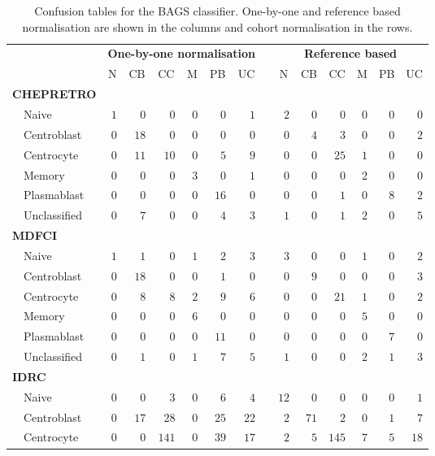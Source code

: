 \begin{table}[!tbp]
{\small
\caption{Confusion tables for the BAGS classifier. One-by-one and reference
based normalisation are shown in the columns and cohort normalisation in the
rows.\label{tab:BAGShemaclass}} 
\begin{center}
\begin{tabular}{lrrrrrrcrrrrrr}
\hline\hline
\multicolumn{1}{l}{\bfseries }&\multicolumn{6}{c}{\bfseries One-by-one normalisation}&\multicolumn{1}{c}{\bfseries }&\multicolumn{6}{c}{\bfseries Reference based}\tabularnewline
\cline{2-7} \cline{9-14}
\multicolumn{1}{l}{}&\multicolumn{1}{c}{N}&\multicolumn{1}{c}{CB}&\multicolumn{1}{c}{CC}&\multicolumn{1}{c}{M}&\multicolumn{1}{c}{PB}&\multicolumn{1}{c}{UC}&\multicolumn{1}{c}{}&\multicolumn{1}{c}{N}&\multicolumn{1}{c}{CB}&\multicolumn{1}{c}{CC}&\multicolumn{1}{c}{M}&\multicolumn{1}{c}{PB}&\multicolumn{1}{c}{UC}\tabularnewline
\hline
{\bfseries CHEPRETRO}&&&&&&&&&&&&&\tabularnewline
~~Naive&$1$&$ 0$&$  0$&$0$&$ 0$&$ 1$&&$ 2$&$ 0$&$  0$&$ 0$&$ 0$&$ 0$\tabularnewline
~~Centroblast&$0$&$18$&$  0$&$0$&$ 0$&$ 0$&&$ 0$&$ 4$&$  3$&$ 0$&$ 0$&$ 2$\tabularnewline
~~Centrocyte&$0$&$11$&$ 10$&$0$&$ 5$&$ 9$&&$ 0$&$ 0$&$ 25$&$ 1$&$ 0$&$ 0$\tabularnewline
~~Memory&$0$&$ 0$&$  0$&$3$&$ 0$&$ 1$&&$ 0$&$ 0$&$  0$&$ 2$&$ 0$&$ 0$\tabularnewline
~~Plasmablast&$0$&$ 0$&$  0$&$0$&$16$&$ 0$&&$ 0$&$ 0$&$  1$&$ 0$&$ 8$&$ 2$\tabularnewline
~~Unclassified&$0$&$ 7$&$  0$&$0$&$ 4$&$ 3$&&$ 1$&$ 0$&$  1$&$ 2$&$ 0$&$ 5$\tabularnewline
\hline
{\bfseries MDFCI}&&&&&&&&&&&&&\tabularnewline
~~Naive&$1$&$ 1$&$  0$&$1$&$ 2$&$ 3$&&$ 3$&$ 0$&$  0$&$ 1$&$ 0$&$ 2$\tabularnewline
~~Centroblast&$0$&$18$&$  0$&$0$&$ 1$&$ 0$&&$ 0$&$ 9$&$  0$&$ 0$&$ 0$&$ 3$\tabularnewline
~~Centrocyte&$0$&$ 8$&$  8$&$2$&$ 9$&$ 6$&&$ 0$&$ 0$&$ 21$&$ 1$&$ 0$&$ 2$\tabularnewline
~~Memory&$0$&$ 0$&$  0$&$6$&$ 0$&$ 0$&&$ 0$&$ 0$&$  0$&$ 5$&$ 0$&$ 0$\tabularnewline
~~Plasmablast&$0$&$ 0$&$  0$&$0$&$11$&$ 0$&&$ 0$&$ 0$&$  0$&$ 0$&$ 7$&$ 0$\tabularnewline
~~Unclassified&$0$&$ 1$&$  0$&$1$&$ 7$&$ 5$&&$ 1$&$ 0$&$  0$&$ 2$&$ 1$&$ 3$\tabularnewline
\hline
{\bfseries IDRC}&&&&&&&&&&&&&\tabularnewline
~~Naive&$0$&$ 0$&$  3$&$0$&$ 6$&$ 4$&&$12$&$ 0$&$  0$&$ 0$&$ 0$&$ 1$\tabularnewline
~~Centroblast&$0$&$17$&$ 28$&$0$&$25$&$22$&&$ 2$&$71$&$  2$&$ 0$&$ 1$&$ 7$\tabularnewline
~~Centrocyte&$0$&$ 0$&$141$&$0$&$39$&$17$&&$ 2$&$ 5$&$145$&$ 7$&$ 5$&$18$\tabularnewline

\end{tabular}
\end{center}}
\end{table}
